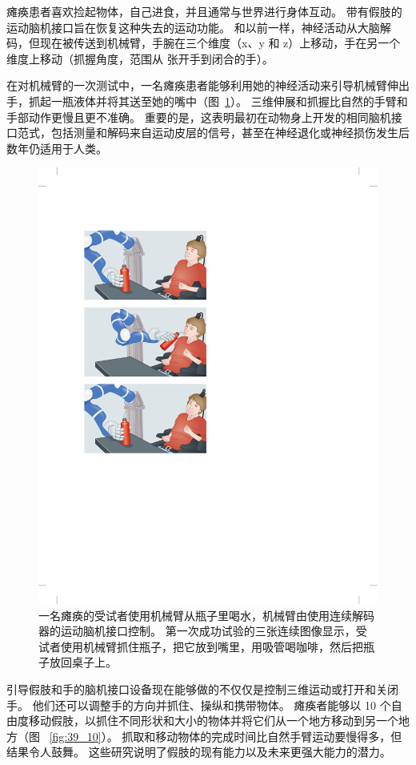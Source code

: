 瘫痪患者喜欢捡起物体，自己进食，并且通常与世界进行身体互动。
带有假肢的运动脑机接口旨在恢复这种失去的运动功能。 
和以前一样，神经活动从大脑解码，但现在被传送到机械臂，手腕在三个维度（x、y 和 z）上移动，手在另一个维度上移动（抓握角度，范围从 张开手到闭合的手）。


在对机械臂的一次测试中，一名瘫痪患者能够利用她的神经活动来引导机械臂伸出手，抓起一瓶液体并将其送至她的嘴中（图~\ref{fig:39_9}）。
三维伸展和抓握比自然的手臂和手部动作更慢且更不准确。
重要的是，这表明最初在动物身上开发的相同脑机接口范式，包括测量和解码来自运动皮层的信号，甚至在神经退化或神经损伤发生后数年仍适用于人类。


\begin{figure}[htbp]
	\centering
	\includegraphics[width=0.4\linewidth]{chap39/fig_39_9}
	\caption{一名瘫痪的受试者使用机械臂从瓶子里喝水，机械臂由使用连续解码器的运动脑机接口控制。 
		第一次成功试验的三张连续图像显示，受试者使用机械臂抓住瓶子，把它放到嘴里，用吸管喝咖啡，然后把瓶子放回桌子上\cite{hochberg2012reach}。}
	\label{fig:39_9}
\end{figure}


引导假肢和手的脑机接口设备现在能够做的不仅仅是控制三维运动或打开和关闭手。
他们还可以调整手的方向并抓住、操纵和携带物体。
瘫痪者能够以 10 个自由度移动假肢，以抓住不同形状和大小的物体并将它们从一个地方移动到另一个地方（图 ~\ref{fig:39_10}）。
抓取和移动物体的完成时间比自然手臂运动要慢得多，但结果令人鼓舞。
这些研究说明了假肢的现有能力以及未来更强大能力的潜力。


